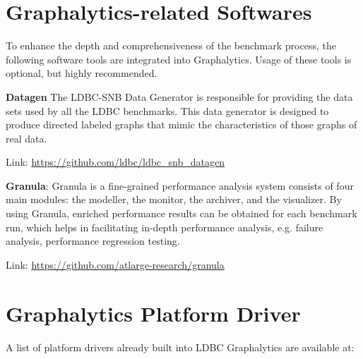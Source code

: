 \section{Graphalytics-related Softwares}\label{sec:instructions:related}
To enhance the depth and comprehensiveness of the benchmark process, the following software tools are integrated into Graphalytics. Usage of these tools is optional, but highly recommended.


\textbf{Datagen} The LDBC-SNB Data Generator is responsible for providing the data sets used by all the LDBC benchmarks. This data generator is designed to produce directed labeled graphs that mimic the characteristics of those graphs of real data. 

\qquad Link: \url{https://github.com/ldbc/ldbc_snb_datagen}



\textbf{Granula}:  Granula is a fine-grained performance analysis system consists of four main modules: the modeller, the monitor, the archiver, and the visualizer. 
By using Granula, enriched performance results can be obtained for each benchmark run, which helps in facilitating in-depth performance analysis, e.g. failure analysis, performance regression testing.

\qquad Link: \url{https://github.com/atlarge-research/granula}







\section{Graphalytics Platform Driver}\label{sec:instructions:drivers}
A list of platform drivers already built into LDBC Graphalytics are available at:

